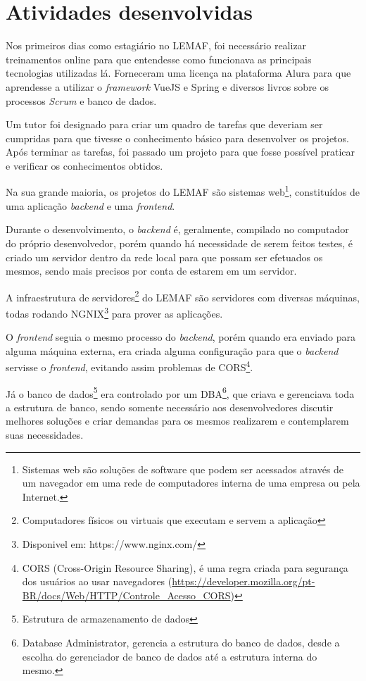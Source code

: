 \chapter{Atividades desenvolvidas}
\label{cap:desenvolvimento}

Nos primeiros dias como estagiário no LEMAF, foi necessário realizar treinamentos online para que entendesse como funcionava as principais tecnologias utilizadas lá.
Forneceram uma licença na plataforma Alura para que aprendesse a utilizar o \textit{framework} VueJS e Spring e diversos livros sobre os processos \textit{Scrum} e banco de dados.

Um tutor foi designado para criar um quadro de tarefas que deveriam ser cumpridas para que tivesse o conhecimento básico para desenvolver os projetos.
Após terminar as tarefas, foi passado um projeto para que fosse possível praticar e verificar os conhecimentos obtidos.

Na sua grande maioria, os projetos do LEMAF são sistemas web\footnote{Sistemas web são soluções de software que podem ser acessados através de um navegador  em uma rede de computadores interna de uma empresa ou pela Internet.
}, constituídos de uma aplicação \textit{backend} e uma \textit{frontend}.

Durante o desenvolvimento, o \textit{backend} é, geralmente, compilado no computador do próprio desenvolvedor, porém quando há necessidade de serem feitos testes, é criado um servidor dentro da rede local para que possam ser efetuados os mesmos, sendo mais precisos por conta de estarem em um servidor.

A infraestrutura de servidores\footnote{Computadores físicos ou virtuais que executam e servem a aplicação} do LEMAF são servidores com diversas máquinas, todas rodando NGNIX\footnote{Disponivel em: https://www.nginx.com/} para prover as aplicações.

O \textit{frontend} seguia o mesmo processo do \textit{backend}, porém quando era enviado para alguma máquina externa, era criada alguma configuração para que o \textit{backend} servisse o \textit{frontend}, evitando assim problemas de CORS\footnote{CORS  (Cross-Origin Resource Sharing), é uma regra criada para segurança dos usuários ao  usar navegadores (\url{https://developer.mozilla.org/pt-BR/docs/Web/HTTP/Controle_Acesso_CORS})}.

Já o banco de dados\footnote{Estrutura de armazenamento de dados} era controlado por um DBA\footnote{Database Administrator, gerencia a estrutura do banco de dados, desde a escolha do gerenciador de banco de dados até a estrutura interna do mesmo.}, que criava e gerenciava toda a estrutura de banco, sendo somente necessário aos desenvolvedores discutir melhores soluções e criar demandas para os mesmos realizarem e contemplarem suas necessidades.

